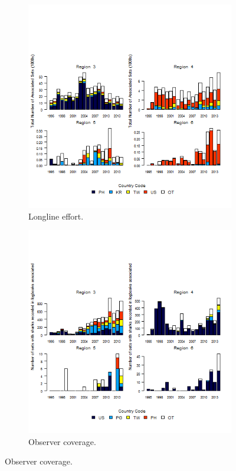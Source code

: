 \documentclass[12pt]{SCreport}
\begin{document}
\begin{landscape}
\begin{figure}
\centering
   \begin{subfigure}[b]{0.49\textwidth}
       \includegraphics[width=\textwidth]{../GRAPHICS/Defined/FIG_08a_ps_total_effAssociated}
       \caption{Longline effort.}
       \label{fig:test1}
   \end{subfigure}
   \begin{subfigure}[b]{0.49\textwidth}
       \includegraphics[width=\textwidth]{../GRAPHICS/Defined/FIG_08b_ps_oper_shks_rep_cntry_associated}
       \caption{Observer coverage.}
       \label{fig:test2}
   \end{subfigure}


\end{figure}
\end{landscape}
\end{document}
